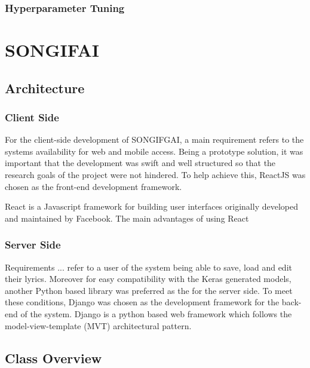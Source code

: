 \subsubsection{Hyperparameter Tuning}
\section{SONGIFAI}
\subsection{Architecture}
\subsubsection{Client Side}
For the client-side development of SONGIFGAI, a main requirement refers to the systems availability for web and mobile access. Being a prototype solution, it was important that the development was swift and well structured so that the research goals of the project were not hindered. To help achieve this, ReactJS was chosen as the front-end development framework.

\noindent
\newline
React is a Javascript framework for building user interfaces originally developed and maintained by Facebook. The main advantages of using React
\subsubsection{Server Side}
Requirements ... refer to a user of the system being able to save, load and edit their lyrics. Moreover for easy compatibility with the Keras generated models, another Python based library was preferred as the for the server side. To meet these conditions, Django was chosen as the development framework for the back-end of the system. Django is a python based web framework which follows the model-view-template (MVT) architectural pattern.
\subsection{Class Overview}